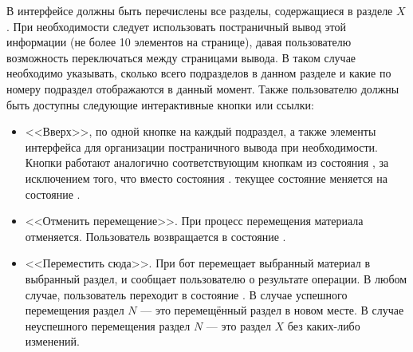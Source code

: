\begin{enumerate}
            В интерфейсе должны быть перечислены все разделы, содержащиеся в разделе
            \(X\). При необходимости следует использовать постраничный вывод этой информации
            (не более 10 элементов на странице), давая пользователю возможность переключаться
            между страницами вывода. В таком случае необходимо указывать, сколько всего подразделов
            в данном разделе и какие по номеру подраздел отображаются в данный момент.
            Также пользователю должны быть доступны следующие интерактивные кнопки или ссылки:
            \begin{itemize}
                \item
                    <<Вверх>>, по одной кнопке на каждый подраздел, а также
                    элементы интерфейса для организации постраничного вывода при необходимости.
                    Кнопки работают аналогично соответствующим кнопкам из состояния 
                    \hyperref[itm:req:ui:states:navx]
                    {}, за исключением того,
                    что вместо состояния
                    \hyperref[itm:req:ui:states:navx]
                    {}.
                    текущее состояние меняется на состояние
                    \hyperref[itm:req:ui:states:move-kbo]
                    {}.
                \item
                    <<Отменить перемещение>>.
                    При  процесс перемещения материала отменяется.
                    Пользователь возвращается в состояние
                    \hyperref[itm:req:ui:states:navx]
                    {}.
                \item
                    <<Переместить сюда>>.
                    При  бот перемещает выбранный материал в выбранный раздел,
                    и сообщает пользователю о результате операции. В любом случае, пользователь
                    переходит в состояние
                    \hyperref[itm:req:ui:states:navx]
                    {}.
                    В случае успешного перемещения раздел \(N\) --- это перемещённый раздел
                    в новом месте. В случае неуспешного перемещения раздел \(N\) --- это раздел \(X\)
                    без каких-либо изменений.
            \end{itemize}


\end{enumerate}
